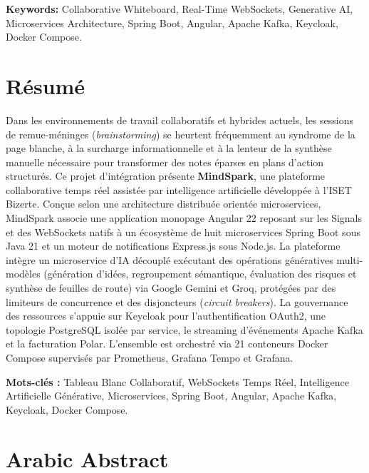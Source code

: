 \medskip
\noindent\textbf{Keywords:} Collaborative Whiteboard, Real-Time WebSockets, Generative AI, Microservices Architecture, Spring Boot, Angular, Apache Kafka, Keycloak, Docker Compose.

\vspace{0.35cm}

\section*{Résumé}
\noindent Dans les environnements de travail collaboratifs et hybrides actuels, les sessions de remue-méninges (\textit{brainstorming}) se heurtent fréquemment au syndrome de la page blanche, à la surcharge informationnelle et à la lenteur de la synthèse manuelle nécessaire pour transformer des notes éparses en plans d'action structurés. Ce projet d'intégration présente \textbf{MindSpark}, une plateforme collaborative temps réel assistée par intelligence artificielle développée à l'ISET Bizerte. Conçue selon une architecture distribuée orientée microservices, MindSpark associe une application monopage Angular 22 reposant sur les Signals et des WebSockets natifs à un écosystème de huit microservices Spring Boot sous Java 21 et un moteur de notifications Express.js sous Node.js. La plateforme intègre un microservice d'IA découplé exécutant des opérations génératives multi-modèles (génération d'idées, regroupement sémantique, évaluation des risques et synthèse de feuilles de route) via Google Gemini et Groq, protégées par des limiteurs de concurrence et des disjoncteurs (\textit{circuit breakers}). La gouvernance des ressources s'appuie sur Keycloak pour l'authentification OAuth2, une topologie PostgreSQL isolée par service, le streaming d'événements Apache Kafka et la facturation Polar. L'ensemble est orchestré via 21 conteneurs Docker Compose supervisés par Prometheus, Grafana Tempo et Grafana.

\medskip
\noindent\textbf{Mots-clés :} Tableau Blanc Collaboratif, WebSockets Temps Réel, Intelligence Artificielle Générative, Microservices, Spring Boot, Angular, Apache Kafka, Keycloak, Docker Compose.

\vspace{0.35cm}

\section*{Arabic Abstract}
\begin{center}
\end{center}
